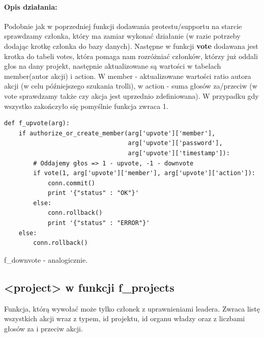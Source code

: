 \documentclass{article}
\begin{document}
\paragraph{Opis działania: }
Podobnie jak w poprzedniej funkcji dodawania protestu/supportu na starcie sprawdzamy członka, który ma zamiar wykonać działanie (w razie potrzeby dodając krotkę członka do bazy danych). \newline
Następne w funkcji \textbf{vote} dodawana jest krotka do tabeli votes, która pomaga nam rozróżniać członków, którzy już oddali głos na dany projekt, następnie aktualizowane są wartości w tabelach member(autor akcji) i action. W member - aktualizowane wartości ratio autora akcji (w celu późniejszego szukania trolli), w action - suma głosów za/przeciw (w vote sprawdzamy także czy akcja jest uprzednio zdefiniowana). W przypadku gdy wszystko zakończyło się pomyślnie funkcja zwraca 1.
\begin{verbatim}
def f_upvote(arg):
    if authorize_or_create_member(arg['upvote']['member'],
                                  arg['upvote']['password'], 
                                  arg['upvote']['timestamp']):
        # Oddajemy głos => 1 - upvote, -1 - downvote
        if vote(1, arg['upvote']['member'], arg['upvote']['action']):
            conn.commit()
            print '{"status" : "OK"}'
        else:
            conn.rollback()   
            print '{"status" : "ERROR"}'
    else:
        conn.rollback() 
\end{verbatim}
f\_downvote - analogicznie.








\newpage
\subsection{<project> w funkcji f\_projects }
Funkcja, którą wywołać może tylko członek z uprawnieniami leadera. Zwraca listę wszystkich akcji wraz z typem, id projektu, id organu władzy oraz z liczbami głosów za i przeciw akcji.
\end{document}
